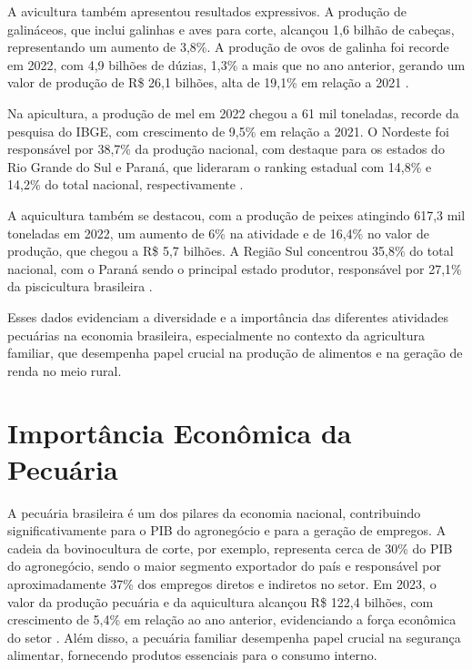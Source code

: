 A avicultura também apresentou resultados expressivos. A produção de galináceos, que inclui galinhas e aves para corte, alcançou 1,6 bilhão de cabeças, representando um aumento de 3,8\%. A produção de ovos de galinha foi recorde em 2022, com 4,9 bilhões de dúzias, 1,3\% a mais que no ano anterior, gerando um valor de produção de R\$ 26,1 bilhões, alta de 19,1\% em relação a 2021 \cite{agenciaBrasil2023}.

Na apicultura, a produção de mel em 2022 chegou a 61 mil toneladas, recorde da pesquisa do IBGE, com crescimento de 9,5\% em relação a 2021. O Nordeste foi responsável por 38,7\% da produção nacional, com destaque para os estados do Rio Grande do Sul e Paraná, que lideraram o ranking estadual com 14,8\% e 14,2\% do total nacional, respectivamente \cite{agenciaBrasil2023}.

A aquicultura também se destacou, com a produção de peixes atingindo 617,3 mil toneladas em 2022, um aumento de 6\% na atividade e de 16,4\% no valor de produção, que chegou a R\$ 5,7 bilhões. A Região Sul concentrou 35,8\% do total nacional, com o Paraná sendo o principal estado produtor, responsável por 27,1\% da piscicultura brasileira \cite{agenciaBrasil2023}.

Esses dados evidenciam a diversidade e a importância das diferentes atividades pecuárias na economia brasileira, especialmente no contexto da agricultura familiar, que desempenha papel crucial na produção de alimentos e na geração de renda no meio rural.

\section{Importância Econômica da Pecuária}
\label{sec:fundamentacao-teorica-importancia-economica}

A pecuária brasileira é um dos pilares da economia nacional, contribuindo significativamente para o \gls{PIB} do agronegócio e para a geração de empregos. A cadeia da bovinocultura de corte, por exemplo, representa cerca de 30\% do PIB do agronegócio, sendo o maior segmento exportador do país e responsável por aproximadamente 37\% dos empregos diretos e indiretos no setor. Em 2023, o valor da produção pecuária e da aquicultura alcançou R\$ 122,4 bilhões, com crescimento de 5,4\% em relação ao ano anterior, evidenciando a força econômica do setor \cite{importanciaBovinocultura}. Além disso, a pecuária familiar desempenha papel crucial na segurança alimentar, fornecendo produtos essenciais para o consumo interno.

